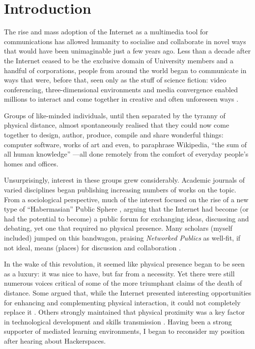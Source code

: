 \section{Introduction}
\label{intro}

The rise and mass adoption of the Internet as a multimedia tool for communications has allowed humanity to socialise and collaborate in novel ways that would have been unimaginable just a few years ago. Less than a decade after the Internet ceased to be the exclusive domain of University members and a handful of corporations, people from around the world began to communicate in ways that were, before that, seen only as the stuff of science fiction: video conferencing, three-dimensional environments and media convergence enabled millions to interact and come together in creative and often unforeseen ways \citep{blackman98,syvertsen03,dowding01}.

Groups of like-minded individuals, until then separated by the tyranny of physical distance, almost spontaneously realised that they could now come together to design, author, produce, compile and share wonderful things: computer software, works of art and even, to paraphrase Wikipedia, ``the sum of all human knowledge'' ---all done remotely from the comfort of everyday people's homes and offices. 

Unsurprisingly, interest in these groups grew considerably. Academic journals of varied disciplines began publishing increasing numbers of works on the topic. From a sociological perspective, much of the interest focused on the rise of a new type of ``Habermasian'' Public Sphere \citep{dahlberg01,poster01,gimmler01}, arguing that the Internet had become (or had the potential to become) a public forum for exchanging ideas, discussing and debating, yet one that required no physical presence. Many scholars (myself included) jumped on this bandwagon, praising \textit{Networked Publics} as well-fit, if not ideal, means (places) for discussion and collaboration \citep{boyd08,ito08,moreira09,angel09}.

In the wake of this revolution, it seemed like physical presence began to be seen as a luxury: it was nice to have, but far from a necessity. Yet there were still numerous voices critical of some of the more triumphant claims of the death of distance. Some argued that, while the Internet presented interesting opportunities for enhancing and complementing physical interaction, it could not completely replace it \citep{dahlberg01,dahlberg01b,dahlgren05}. Others strongly maintained that physical proximity was a key factor in technological development and skills transmission \citep{howells00,oinas00,morgan04}. Having been a strong supporter of mediated learning environments, I began to reconsider my position after hearing about Hackerspaces.

